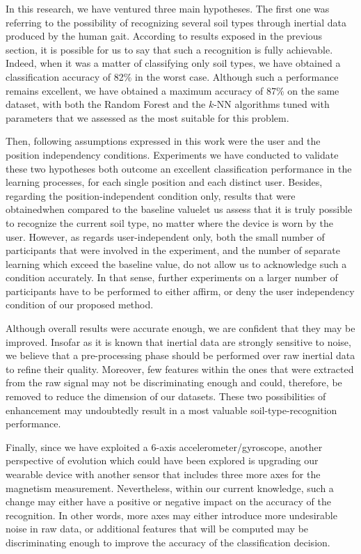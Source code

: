 \documentclass[conference]{IEEEtran}
\begin{document}
In this research, we have ventured three main hypotheses. The first one was referring to the possibility of recognizing several soil types through inertial data produced by the human gait. According to results exposed in the previous section, it is possible for us to say that such a recognition is fully achievable. Indeed, when it was a matter of classifying only soil types, we have obtained a classification accuracy of 82\% in the worst case. Although such a performance remains excellent, we have obtained a maximum accuracy of  87\% on the same dataset, with both the Random Forest and the $k$-NN algorithms tuned with parameters that we assessed as the most suitable for this problem.

Then, following assumptions expressed in this work were the user and the position independency conditions. Experiments we have conducted to validate these two hypotheses both outcome an excellent classification performance in the learning processes, for each single position and each distinct user. Besides, regarding the position-independent condition only, results that were obtained\textemdash when compared to the baseline value\textemdash let us assess that it is truly possible to recognize the current soil type, no matter where the device is worn by the user. However, as regards user-independent only, both the small number of participants that were involved in the experiment, and the number of separate learning which exceed the baseline value, do not allow us to acknowledge such a condition accurately. In that sense, further experiments on a larger number of participants have to be performed to either affirm, or deny the user independency condition of our proposed method.

Although overall results were accurate enough, we are confident that they may be improved. Insofar as it is known that inertial data are strongly sensitive to noise, we believe that a pre-processing phase should be performed over raw inertial data to refine their quality. Moreover, few features within the ones that were extracted from the raw signal may not be discriminating enough and could, therefore, be removed to reduce the dimension of our datasets. These two possibilities of enhancement may undoubtedly result in a most valuable soil-type-recognition performance.

Finally, since we have exploited a 6-axis accelerometer/gyroscope, another perspective of evolution which could have been explored is upgrading our wearable device with another sensor that includes three more axes for the magnetism measurement. Nevertheless, within our current knowledge, such a change may either have a positive or negative impact on the accuracy of the recognition. In other words, more axes may either introduce more undesirable noise in raw data, or additional features that will be computed may be discriminating enough to improve the accuracy of the classification decision.
\end{document}
